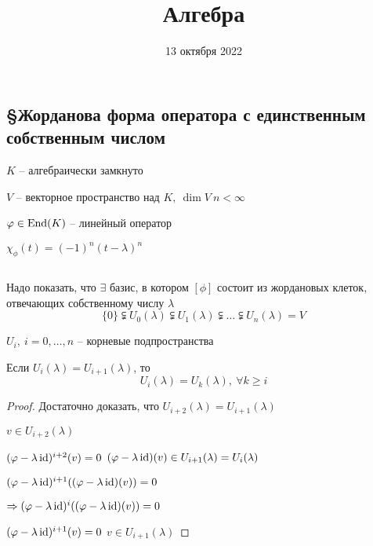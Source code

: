 

\setcounter{lemma}{0}


    \title{Алгебра}
    \date{13 октября 2022}
    \maketitle

    \pagebreak

    \subsection*{\S Жорданова форма оператора с единственным собственным числом}

    \par $K$ -- алгебраически замкнуто
    \par $V$ -- векторное пространство над $K, \ \dim V \ n < \infty$
    \par $\varphi \in \operatorname{End}(K)$ -- линейный оператор
    \par $\chi_\phi(t) = (-1)^n (t - \lambda)^n$
    \par $ $
    \par Надо показать, что $\exists$ базис, в котором $[\phi]$ состоит из жордановых клеток, отвечающих
    собственному числу $\lambda$
    \[
        \{0\} \subsetneqq U_0(\lambda) \subsetneqq U_1(\lambda) \subsetneqq \dots \subsetneqq U_n(\lambda) = V    
    \]
    \par $U_i, \ i = 0, \dots, n$ -- корневые подпространства

    \begin{lemma}
        Если $U_i(\lambda) = U_{i+1}(\lambda)$, то
        \[
            U_i(\lambda) = U_k(\lambda), \ \forall k \ge i    
        \]
    \end{lemma}

    \begin{proof}
        Достаточно доказать, что $U_{i+2}(\lambda) = U_{i+1}(\lambda)$
        \par \quad $v \in U_{i+2}(\lambda)$
        \par \quad $(\varphi - \lambda \operatorname{id})^{i+2}(v) = 0$ \quad $(\varphi - \lambda \operatorname{id})(v) \in U_{i+1}(\lambda) = U_i(\lambda)$
        \par \quad $(\varphi - \lambda \operatorname{id})^{i+1}((\varphi - \lambda \operatorname{id})(v)) = 0$
        \par $\Rightarrow (\varphi - \lambda \operatorname{id})^i((\varphi - \lambda \operatorname{id})(v)) = 0$
        \par \quad $(\varphi - \lambda\operatorname{id})^{i+1}(v) = 0$ \quad $v \in U_{i+1}(\lambda)$
    \end{proof}

